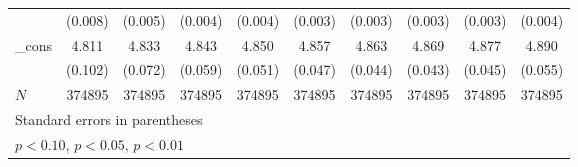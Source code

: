 {\begin{tabular}{l*{9}{c}}
            &     (0.008)         &     (0.005)         &     (0.004)         &     (0.004)         &     (0.003)         &     (0.003)         &     (0.003)         &     (0.003)         &     (0.004)         \\
[1em]
_cons       &       4.811\sym{***}&       4.833\sym{***}&       4.843\sym{***}&       4.850\sym{***}&       4.857\sym{***}&       4.863\sym{***}&       4.869\sym{***}&       4.877\sym{***}&       4.890\sym{***}\\
            &     (0.102)         &     (0.072)         &     (0.059)         &     (0.051)         &     (0.047)         &     (0.044)         &     (0.043)         &     (0.045)         &     (0.055)         \\
\hline
\(N\)       &      374895         &      374895         &      374895         &      374895         &      374895         &      374895         &      374895         &      374895         &      374895         \\
\hline\hline
\multicolumn{10}{p{\linewidth}}{\footnotesize Standard errors in parentheses}\\
\multicolumn{10}{p{\linewidth}}{\footnotesize \sym{*} \(p<0.10\), \sym{**} \(p<0.05\), \sym{***} \(p<0.01\)}\\
\end{tabular}
}
